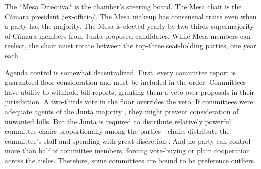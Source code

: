 \documentclass[letter,12pt]{article}
\begin{document}

The *Mesa Directiva* is the chamber's steering board. The Mesa chair is the Cámara president /ex-officio/. The Mesa makeup has consensual traits even when a party has the majority. The Mesa is elected yearly by two-thirds supermajority of Cámara members from Junta-proposed candidates. While Mesa members can reelect, the chair must rotate between the top-three seat-holding parties, one year each. 



Agenda control is somewhat decentralized. First, every committee report is guaranteed floor consideration and must be included in the order. Committees have ability to withhold bill reports, granting them a veto over proposals in their jurisdiction. A two-thirds vote in the floor overrides the veto. If committees were adequate agents of the Junta majority \citep[cf.][]{cox.mccubbins.1993}, they might prevent consideration of unwanted bills. But the Junta is required to distribute relatively powerful committee chairs proportionally among the parties---chairs distribute the committee's staff and spending with great discretion \citep{casar.2011}. And no party can control more than half of committee members, forcing vote-buying or plain cooperation across the aisles. Therefore, some committees are bound to be preference outliers.
\end{document}
